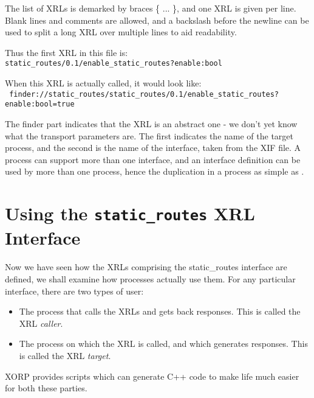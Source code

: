 \documentclass[11pt]{article}
\begin{document}
The list of XRLs is demarked by braces {\stt \{ ... \}}, and one XRL is
given per line.  Blank lines and comments are allowed, and a backslash
before the newline can be used to split a long XRL over multiple lines
to aid readability.

\vspace{0.1in}
\noindent
Thus the first XRL in this file is:\\
 {\tt\small static\_routes/0.1/enable\_static\_routes?enable:bool}

\vspace{0.1in}
\noindent
When this XRL is actually called, it would look like:\\
{\tt\small
  finder://static\_routes/static\_routes/0.1/enable\_static\_routes?enable:bool=true}

\vspace{0.1in} The {\stt finder} part indicates that the XRL is an
abstract one - we don't yet know what the transport parameters are.
The first \SR indicates the name of the target process, and the second
\SR is the name of the interface, taken from the XIF
file.  A process can support more than one interface, and an interface
definition can be used by more than one process, hence the duplication
in a process as simple as \SRI.

\newpage

\section{Using the {\tt static\_routes} XRL Interface}

Now we have seen how the XRLs comprising the static\_routes interface
are defined, we shall examine how processes actually use them.  For
any particular interface, there are two types of user:

\begin{itemize}

  \item The process that calls the XRLs and gets back responses.  This
  is called the XRL {\it caller}.

  \item The process on which the XRL is called, and which generates
  responses.  This is called the XRL {\it target}.

\end{itemize}

XORP provides scripts which can generate C++ code to make life much
easier for both these parties.
\end{document}
